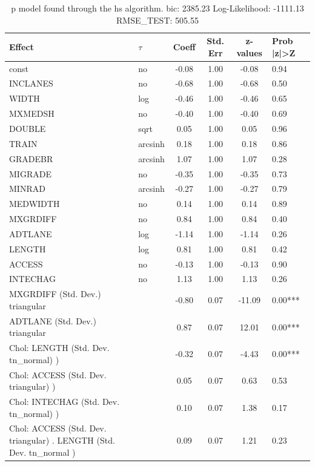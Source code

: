 \begin{table}
	\caption{p model found through the hs algorithm. bic: 2385.23 Log-Likelihood: -1111.13 RMSE_TEST: 505.55}
	\begin{center}
		\begin{tabular}{|l|l|c|c|c|l|}
			\hline
			Effect & $\tau$ & Coeff & Std. Err & z-values & Prob |z|>Z \\
			\hline
			const & no & -0.08 & 1.00 & -0.08 & 0.94 \\
			\hline
			INCLANES & no & -0.68 & 1.00 & -0.68 & 0.50 \\
			\hline
			WIDTH & log & -0.46 & 1.00 & -0.46 & 0.65 \\
			\hline
			MXMEDSH & no & -0.40 & 1.00 & -0.40 & 0.69 \\
			\hline
			DOUBLE & sqrt & 0.05 & 1.00 & 0.05 & 0.96 \\
			\hline
			TRAIN & arcsinh & 0.18 & 1.00 & 0.18 & 0.86 \\
			\hline
			GRADEBR & arcsinh & 1.07 & 1.00 & 1.07 & 0.28 \\
			\hline
			MIGRADE & no & -0.35 & 1.00 & -0.35 & 0.73 \\
			\hline
			MINRAD & arcsinh & -0.27 & 1.00 & -0.27 & 0.79 \\
			\hline
			MEDWIDTH & no & 0.14 & 1.00 & 0.14 & 0.89 \\
			\hline
			MXGRDIFF & no & 0.84 & 1.00 & 0.84 & 0.40 \\
			\hline
			ADTLANE & log & -1.14 & 1.00 & -1.14 & 0.26 \\
			\hline
			LENGTH & log & 0.81 & 1.00 & 0.81 & 0.42 \\
			\hline
			ACCESS & no & -0.13 & 1.00 & -0.13 & 0.90 \\
			\hline
			INTECHAG & no & 1.13 & 1.00 & 1.13 & 0.26 \\
			\hline
			MXGRDIFF (Std. Dev.) triangular &  & -0.80 & 0.07 & -11.09 & 0.00*** \\
			\hline
			ADTLANE (Std. Dev.) triangular &  & 0.87 & 0.07 & 12.01 & 0.00*** \\
			\hline
			 Chol: LENGTH (Std. Dev. tn_normal) ) &  & -0.32 & 0.07 & -4.43 & 0.00*** \\
			\hline
			 Chol: ACCESS (Std. Dev. triangular) ) &  & 0.05 & 0.07 & 0.63 & 0.53 \\
			\hline
			 Chol: INTECHAG (Std. Dev. tn_normal) ) &  & 0.10 & 0.07 & 1.38 & 0.17 \\
			\hline
			 Chol: ACCESS (Std. Dev. triangular) . LENGTH (Std. Dev.   tn_normal ) &  & 0.09 & 0.07 & 1.21 & 0.23 \\

\end{tabular}
\end{center}
\end{table}
